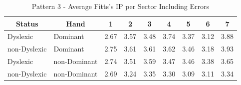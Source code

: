 	\begin{table}[h]
		\centering
		\caption{Pattern 3 - Average Fitts's IP per Sector Including Errors}
		\label{tab_pat_3_ip_all}
		\begin{tabularx}{\textwidth}{|l|l|X|X|X|X|X|X|X|}
			\hline
			\multicolumn{1}{|c|}{\textbf{Status}} & \multicolumn{1}{c|}{\textbf{Hand}} & \multicolumn{1}{c|}{\textbf{1}} & \multicolumn{1}{c|}{\textbf{2}} & \multicolumn{1}{c|}{\textbf{3}} & \multicolumn{1}{c|}{\textbf{4}} & \multicolumn{1}{c|}{\textbf{5}} & \multicolumn{1}{c|}{\textbf{6}} & \multicolumn{1}{c|}{\textbf{7}} \\ \hline
			Dyslexic                              & Dominant                           & 2.67       & 3.57       & 3.48       & 3.74       & 3.37       & 3.12       & 3.88       \\ \hline
			non-Dyslexic                          & Dominant                           & 2.75       & 3.61       & 3.61       & 3.62       & 3.46       & 3.18       & 3.93       \\ \hline
			Dyslexic                              & non-Dominant                       & 2.74       & 3.51       & 3.59       & 3.47       & 3.46       & 3.38       & 3.65       \\ \hline
			non-Dyslexic                          & non-Dominant                       & 2.69       & 3.24       & 3.35       & 3.30       & 3.09       & 3.11       & 3.34       \\ \hline
		\end{tabularx}
	\end{table}


